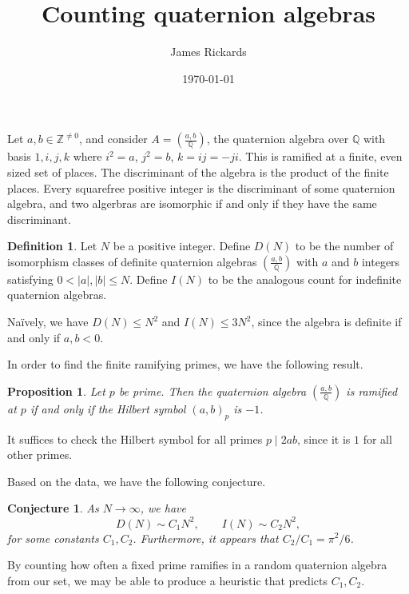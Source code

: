 \documentclass[10pt]{amsart}
\newcommand{\ZZ}{\ensuremath{\mathbb{Z}}}
\newcommand{\QQ}{\ensuremath{\mathbb{Q}}}
\newcommand{\qa}[2]{\ensuremath{\left(\frac{#1, #2}{\QQ}\right)}}%
\newtheorem{conjecture}[theorem]{Conjecture}
\newtheorem{proposition}[theorem]{Proposition}
\theoremstyle{definition}
\newtheorem{definition}[theorem]{Definition}
\numberwithin{equation}{section}
\begin{document}
	
	\title{Counting quaternion algebras}
	\author[J. Rickards]{James Rickards}
	\address{CU Boulder, Boulder, Colorado, USA}
	\date{\today}
	\maketitle
	
	Let $a,b\in\ZZ^{\neq 0}$, and consider $A=\qa{a}{b}$, the quaternion algebra over $\QQ$ with basis $1,i,j,k$ where $i^2=a$, $j^2=b$, $k=ij=-ji$. This is ramified at a finite, even sized set of places. The discriminant of the algebra is the product of the finite places. Every squarefree positive integer is the discriminant of some quaternion algebra, and two algerbras are isomorphic if and only if they have the same discriminant.
	
	\begin{definition}
		Let $N$ be a positive integer. Define $D(N)$ to be the number of isomorphism classes of definite quaternion algebras $\qa{a}{b}$ with $a$ and $b$ integers satisfying $0<|a|,|b|\leq N$. Define $I(N)$ to be the analogous count for indefinite quaternion algebras.
	\end{definition}

Na\"{i}vely, we have $D(N)\leq N^2$ and $I(N)\leq 3N^2$, since the algebra is definite if and only if $a,b<0$.

In order to find the finite ramifying primes, we have the following result.

\begin{proposition}
	Let $p$ be prime. Then the quaternion algebra $\qa{a}{b}$ is ramified at $p$ if and only if the Hilbert symbol $(a,b)_p$ is $-1$.
\end{proposition}

It suffices to check the Hilbert symbol for all primes $p\mid 2ab$, since it is $1$ for all other primes.

Based on the data, we have the following conjecture.

\begin{conjecture}
	As $N\rightarrow\infty$, we have
	\[D(N)\sim C_1 N^2,\qquad I(N)\sim C_2N^2,\]
	for some constants $C_1,C_2$. Furthermore, it appears that $C_2/C_1=\pi^2/6$.
\end{conjecture}
	
By counting how often a fixed prime ramifies in a random quaternion algebra from our set, we may be able to produce a heuristic that predicts $C_1,C_2$.
\end{document}
